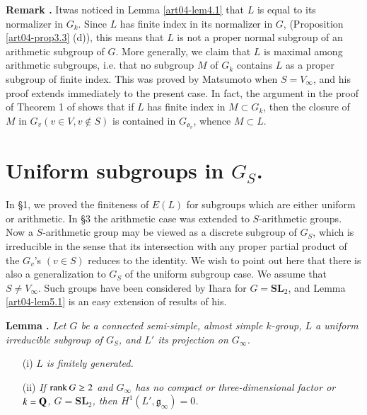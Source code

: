 \noindent
{\bf Remark .\label{art04-rem4.7}}
It\pageoriginale was noticed in Lemma \ref{art04-lem4.1} that $L$ is equal to its normalizer in $G_{k}$. Since $L$ has finite index in its normalizer in $G$, (Proposition \ref{art04-prop3.3} (d)), this means that $L$ is not a proper normal subgroup of an arithmetic subgroup of $G$. More generally, we claim that $L$ is maximal among arithmetic subgroups, i.e. that no subgroup $M$ of $G_{k}$ contains $L$ as a proper subgroup of finite index. This was proved by Matsumoto \cite{art04-key23} when $S=V_{\infty}$, and his proof extends immediately to the present case. In fact, the argument in the proof of Theorem 1 of \cite{art04-key23} shows that if $L$ has finite index in $M\subset G_{k}$, then the closure of $M$ in $G_{v}(v\in V, v\not\in S)$ is contained in $G_{\mathfrak{o}_{v}}$, whence $M\subset L$.

\section{Uniform subgroups in \texorpdfstring{$G_{S}$}{Gs}.}\label{art04-sec5}

In \S1, we proved the finiteness of $E(L)$ for subgroups which are either uniform or arithmetic. In \S3 the arithmetic case was extended to $S$-arithmetic groups. Now a $S$-arithmetic group may be viewed as a discrete subgroup of $G_{S}$, which is irreducible in the sense that its intersection with any proper partial product of the $G_{v}$'s $(v\in S)$ reduces to the identity. We wish to point out here that there is also a generalization to $G_{S}$ of the uniform subgroup case. We assume that $S\neq V_{\infty}$. Such groups have been considered by Ihara \cite{art04-key14} for $G=\mathbf{SL}_{2}$, and Lemma \ref{art04-lem5.1} is an easy extension of results of his.

\medskip
\noindent
{\bf Lemma .\label{art04-lem5.1}}
{\em Let $G$ be a connected semi-simple, almost simple $k$-group, $L$ a uniform irreducible subgroup of $G_{S}$, and $L'$ its projection on $G_{\infty}$.}
\begin{itemize}
\item[{\rm(i)}] {\em $L$ is finitely generated.}

\item[{\rm(ii)}] {\em If $\operatorname{\mathrm{rank}} G\geq 2$ and $G_{\infty}$ has no compact or three-dimensional factor or $k=\mathbf{Q}$, $G=\mathbf{SL}_{2}$, then $H^{1}(L',\mathfrak{g}_{\infty})=0$.}
\end{itemize}

